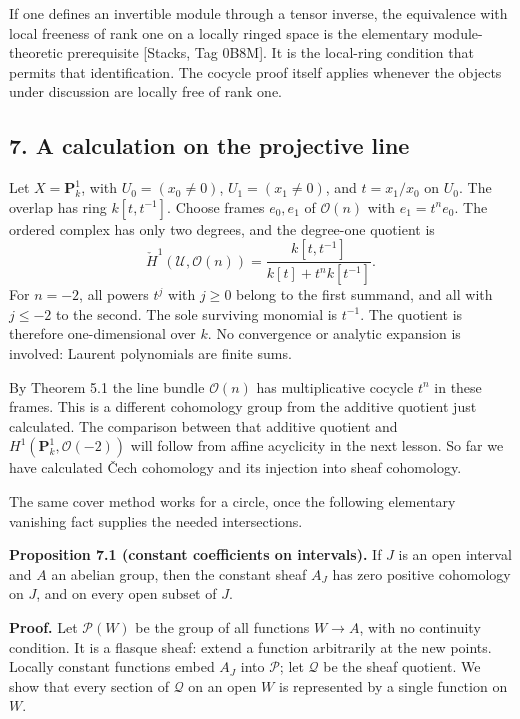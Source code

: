 \documentclass[11pt]{article}
\begin{document}
If one defines an invertible module through a tensor inverse, the
equivalence with local freeness of rank one on a locally ringed space is
the elementary module-theoretic prerequisite {[}Stacks, Tag 0B8M{]}. It
is the local-ring condition that permits that identification. The
cocycle proof itself applies whenever the objects under discussion are
locally free of rank one.

\subsection{7. A calculation on the projective
line}\label{a-calculation-on-the-projective-line}

Let \(X=\mathbf P^1_k\), with \(U_0=(x_0\ne0)\), \(U_1=(x_1\ne0)\), and
\(t=x_1/x_0\) on \(U_0\). The overlap has ring \(k[t,t^{-1}]\). Choose
frames \(e_0,e_1\) of \(\mathcal O(n)\) with \(e_1=t^n e_0\). The
ordered complex has only two degrees, and the degree-one quotient is \[
\check H^1(\mathcal U,\mathcal O(n))
=\frac{k[t,t^{-1}]}{k[t]+t^n k[t^{-1}]}.
\] For \(n=-2\), all powers \(t^j\) with \(j\geq0\) belong to the first
summand, and all with \(j\leq-2\) to the second. The sole surviving
monomial is \(t^{-1}\). The quotient is therefore one-dimensional over
\(k\). No convergence or analytic expansion is involved: Laurent
polynomials are finite sums.

By Theorem 5.1 the line bundle \(\mathcal O(n)\) has multiplicative
cocycle \(t^n\) in these frames. This is a different cohomology group
from the additive quotient just calculated. The comparison between that
additive quotient and \(H^1(\mathbf P^1_k,\mathcal O(-2))\) will follow
from affine acyclicity in the next lesson. So far we have calculated
Čech cohomology and its injection into sheaf cohomology.

The same cover method works for a circle, once the following elementary
vanishing fact supplies the needed intersections.

\textbf{Proposition 7.1 (constant coefficients on intervals).} If \(J\)
is an open interval and \(A\) an abelian group, then the constant sheaf
\(A_J\) has zero positive cohomology on \(J\), and on every open subset
of \(J\).

\textbf{Proof.} Let \(\mathcal P(W)\) be the group of all functions
\(W\to A\), with no continuity condition. It is a flasque sheaf: extend
a function arbitrarily at the new points. Locally constant functions
embed \(A_J\) into \(\mathcal P\); let \(\mathcal Q\) be the sheaf
quotient. We show that every section of \(\mathcal Q\) on an open \(W\)
is represented by a single function on \(W\).
\end{document}
